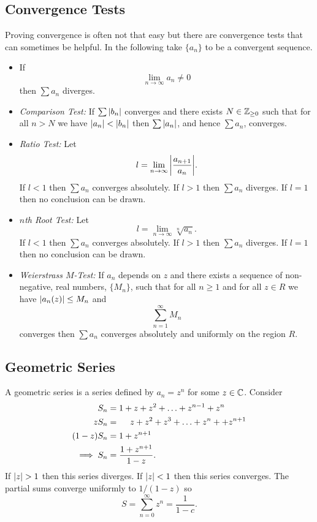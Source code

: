 \documentclass{article}
\begin{document}
    \subsection{Convergence Tests}
    Proving convergence is often not that easy but there are convergence tests that can sometimes be helpful.
    In the following take \(\{a_n\}\) to be a convergent sequence.
    \begin{itemize}
        \item If
        \[\lim_{n\to\infty} a_n \ne 0\]
        then \(\sum a_n\) diverges.
        \item \emph{Comparison Test:} If \(\sum \abs{b_n}\) converges and there exists \(N\in\mathbb{Z}_{\ge0}\) such that for all \(n > N\) we have \(\abs{a_n} < \abs{b_n}\) then \(\sum \abs{a_n}\), and hence \(\sum a_n\), converges.
        \item \emph{Ratio Test:} Let
        \[l = \lim_{n\to\infty} \abs{\frac{a_{n+1}}{a_n}}.\]
        If \(l < 1\) then \(\sum a_n\) converges absolutely.
        If \(l > 1\) then \(\sum a_n\) diverges.
        If \(l = 1\) then no conclusion can be drawn.
        \item \emph{\(n\)th Root Test:} Let
        \[l = \lim_{n\to\infty} \sqrt[n]{a_n}.\]
        If \(l < 1\) then \(\sum a_n\) converges absolutely.
        If \(l > 1\) then \(\sum a_n\) diverges.
        If \(l = 1\) then no conclusion can be drawn.
        \item \emph{Weierstrass \(M\)-Test:} If \(a_n\) depends on \(z\) and there exists a sequence of non-negative, real numbers, \(\{M_n\}\), such that for all \(n \ge 1\) and for all \(z\in R\) we have \(\abs{a_n(z)} \le M_n\) and
        \[\sum_{n=1}^{\infty} M_n\]
        converges then
        \(\sum a_n\) converges absolutely and uniformly on the region \(R\).
    \end{itemize}
    
    \subsection{Geometric Series}
    A geometric series is a series defined by \(a_n = z^n\) for some \(z\in\mathbb{C}\).
    Consider
    \begin{align*}
        S_n &= 1 + z + z^2 + \dotsc + z^{n-1} + z^n\\
        zS_n &= \hphantom{1 +} z + z^2 + z^3 + \dotsc + z^n + + z^{n+1}\\
        (1 - z)S_n &= 1 + z^{n+1}\\
        \implies S_n &= \frac{1 + z^{n+1}}{1 - z}.
    \end{align*}
    If \(\abs{z} > 1\) then this series diverges.
    If \(\abs{z} < 1\) then this series converges.
    The partial sums converge uniformly to \(1 / (1 - z)\) so
    \[S = \sum_{n=0}^{\infty} z^n = \frac{1}{1 - c}.\]
    
\end{document}
